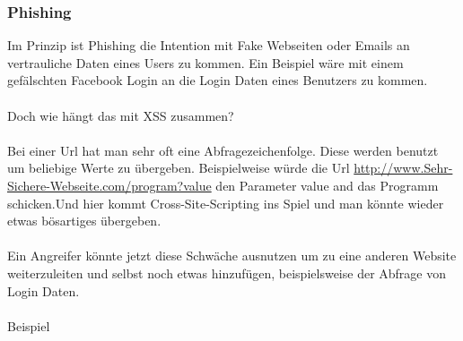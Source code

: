 \subsubsection{Phishing}
\label{sec:xss_phishing}
Im Prinzip ist Phishing die Intention mit Fake Webseiten oder Emails an vertrauliche Daten eines Users zu kommen. Ein Beispiel wäre mit einem gefälschten Facebook Login an die Login Daten eines Benutzers zu kommen. 
\\ \\Doch wie hängt das mit XSS zusammen?\\ \\Bei einer Url hat man sehr oft eine Abfragezeichenfolge. Diese werden benutzt um beliebige Werte zu übergeben. Beispielweise würde die Url 
\url{ http://www.Sehr-Sichere-Webseite.com/program?value} den Parameter value and das Programm schicken.Und hier kommt Cross-Site-Scripting ins Spiel und man könnte wieder etwas bösartiges übergeben.\\ \\Ein Angreifer könnte jetzt diese Schwäche ausnutzen um zu eine anderen Website weiterzuleiten und selbst noch etwas hinzufügen, beispielsweise der Abfrage von Login Daten. \\ \\Beispiel\\ \\
